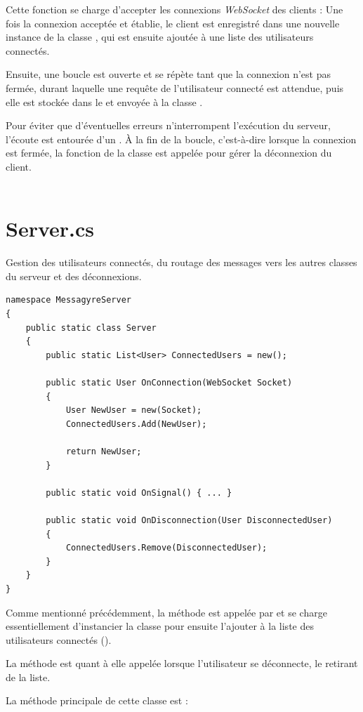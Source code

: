 \documentclass[12pt]{report}
\begin{document}
Cette fonction se charge d'accepter les connexions \textit{WebSocket} des clients : Une fois la connexion acceptée et établie, le client est enregistré dans une nouvelle instance de la classe , qui est ensuite ajoutée à une liste des utilisateurs connectés.

Ensuite, une boucle est ouverte et se répète tant que la connexion n'est pas fermée, durant laquelle une requête de l'utilisateur connecté est attendue, puis elle est stockée dans le  et envoyée à la classe .

Pour éviter que d'éventuelles erreurs n'interrompent l'exécution du serveur, l'écoute est entourée d'un . À la fin de la boucle, c'est-à-dire lorsque la connexion est fermée, la fonction  de la classe  est appelée pour gérer la déconnexion du client.
\\\\
\section{Server.cs}

Gestion des utilisateurs connectés, du routage des messages vers les autres classes du serveur et des déconnexions.

\begin{verbatim}
namespace MessagyreServer
{
	public static class Server
	{
		public static List<User> ConnectedUsers = new();

		public static User OnConnection(WebSocket Socket)
		{
			User NewUser = new(Socket);
			ConnectedUsers.Add(NewUser);

			return NewUser;
		}

		public static void OnSignal() { ... }

		public static void OnDisconnection(User DisconnectedUser)
		{
			ConnectedUsers.Remove(DisconnectedUser);
		}
	}
}
\end{verbatim}

Comme mentionné précédemment, la méthode  est appelée par  et se charge essentiellement d'instancier la classe  pour ensuite l'ajouter à la liste des utilisateurs connectés ().

 La méthode  est quant à elle appelée lorsque l'utilisateur se déconnecte, le retirant de la liste.

 La méthode principale de cette classe est :
\end{document}
